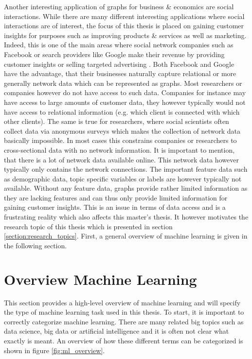 	\noindent Another interesting application of graphs for business \& 
	economics are social interactions. While there are many different
	interesting applications where social interactions are of interest,
	the focus of this thesis is placed on gaining customer insights for 
	purposes such as improving products \& services as well as marketing. Indeed, 
	this is one of the main areas where social network companies such as 
	Facebook or search providers like Google make their revenue by providing 
	customer insights or selling targeted advertising 
	\citep{Facebook2021,Alphabet2021}. Both Facebook and Google have the 
	advantage, that their businesses naturally capture relational or more 
	generally network data which can be represented as graphs. Most researchers 
	or companies however do not have access to such data. Companies for instance 
	may have access to large amounts of customer data, they however typically 
	would not have access to relational information (e.g. which client is 
	connected with which other clients). The same is true for researchers, where 
	social scientists often collect data via anonymous surveys which makes the 
	collection of network data basically impossible. In most cases this 
	constrains companies or researchers to cross-sectional data with no network 
	information. It is important to mention, that there is a lot of network 
	data available online. This network data however typically only contains the 
	network connections. The important feature data such as demographic data, 
	topic specific variables or labels are however typically not available. 
	Without any feature data, graphs provide rather limited information as they 
	are lacking features and can thus only provide limited information for 
	gaining customer insights. This is an issue in terms of data access and is 
	a frustrating reality which also affects this master's thesis. It however 
	motivates the research topic of this thesis which is presented in section
	\ref{section:research_topics}. First, a general overview of machine
	learning is given in the following section.
	
	\section{Overview Machine Learning}

	This section provides a high-level overview of machine learning and
	will specify the type of machine learning task used in this thesis. To
	start, it is important to correctly categorize machine learning. There are
	many related big topics such as data science, big data or artificial
	intelligence and it is often not clear what exactly is meant. An overview
	of how these different terms can be categorized is shown in figure 
	\ref{fig:ml_overview}.

